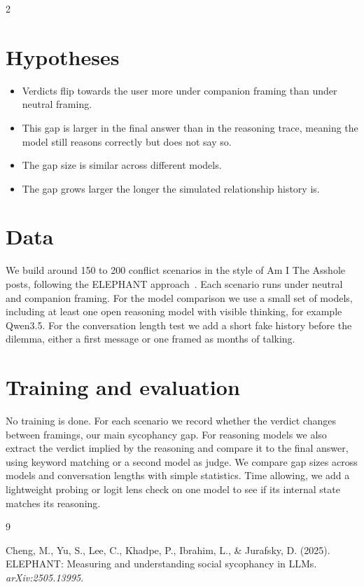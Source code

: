 \documentclass[11pt]{article}
\begin{document}
\begin{multicols}{2}
\section*{Hypotheses}
\begin{itemize}[itemsep=1pt,topsep=2pt,leftmargin=12pt]
  \item Verdicts flip towards the user more under companion framing than under neutral framing.
  \item This gap is larger in the final answer than in the reasoning trace, meaning the model still reasons correctly but does not say so.
  \item The gap size is similar across different models.
  \item The gap grows larger the longer the simulated relationship history is.
\end{itemize}

\columnbreak

\section*{Data}
We build around 150 to 200 conflict scenarios in the style of Am I The Asshole posts, following the ELEPHANT approach~\cite{elephant2025}. Each scenario runs under neutral and companion framing. For the model comparison we use a small set of models, including at least one open reasoning model with visible thinking, for example Qwen3.5. For the conversation length test we add a short fake history before the dilemma, either a first message or one framed as months of talking.

\section*{Training and evaluation}
No training is done. For each scenario we record whether the verdict changes between framings, our main sycophancy gap. For reasoning models we also extract the verdict implied by the reasoning and compare it to the final answer, using keyword matching or a second model as judge. We compare gap sizes across models and conversation lengths with simple statistics. Time allowing, we add a lightweight probing or logit lens check on one model to see if its internal state matches its reasoning.

{\footnotesize
\begin{thebibliography}{9}
\setlength{\itemsep}{1pt}

 Cheng, M., Yu, S., Lee, C., Khadpe, P., Ibrahim, L., \& Jurafsky, D. (2025). ELEPHANT: Measuring and understanding social sycophancy in LLMs. \textit{arXiv:2505.13995}.


\end{thebibliography}}
\end{multicols}
\end{document}
